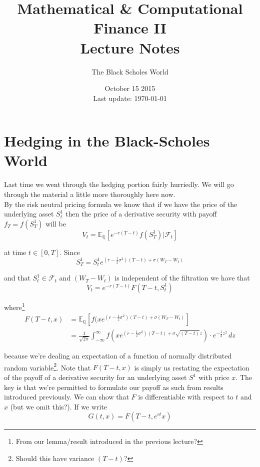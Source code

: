 \documentclass[12pt]{article}
\newlength\tindent
\renewcommand{\indent}{\hspace*{\tindent}}
\begin{document}
 
 
\title{Mathematical \& Computational Finance II\\Lecture Notes}
\author{The Black Scholes World}
\date{October 15 2015 \\ Last update: \today{}}
\maketitle

\section{Hedging in the Black-Scholes World}

\indent Last time we went through the hedging portion fairly hurriedly. We will go through the material a little more thoroughly here now. \\

\indent By the risk neutral pricing formula we know that if we have the price of the underlying asset $S^1_t$ then the price of a derivative security with payoff $f_T = f(S^1_T)$ will be
\begin{equation*}
	V_t = \mathbb E_{\mathbb Q}[e^{-r(T - t)}f(S^1_T) | \mathcal F_t]
\end{equation*}

at time $t \in [0, T]$. Since
\begin{equation*}
	S^1_T = S^1_te^{(r - \frac{1}{2}\sigma^2)(T - t) + \sigma(W_T - W_t)}
\end{equation*}

and that $S^1_t \in \mathcal F_t$ and $(W_T - W_t)$ is independent of the filtration we have that
\begin{equation*}
	V_t = e^{-r(T - t)}F(T - t, S^1_t)
\end{equation*}

where\footnote{From our lemma/result introduced in the previous lecture?} 
\begin{align*}
	F(T - t,x) &= \mathbb E_{\mathbb Q}[f(xe^{(r - \frac{1}{2}\sigma^2)(T - t) + \sigma(W_T - W_t)}] \\
	&= \frac{1}{\sqrt{2\pi}} \int^\infty_{-\infty} f(xe^{(r - \frac{1}{2}\sigma^2)(T - t) + \sigma\sqrt{(T - t)}z}) \cdot e^{-\frac{1}{2}z^2}\,dz
\end{align*}

because we're dealing an expectation of a function of normally distributed random variable\footnote{Should this have variance $(T - t)$?}. Note that $F(T - t,x)$ is simply us restating the expectation of the payoff of a derivative security for an underlying asset $S^1$ with price $x$. The key is that we're permitted to formulate our payoff as such from results introduced previously. We can show that $F$ is differentiable with respect to $t$ and $x$ (but we omit this?). If we write
\begin{equation*}
	G(t,x) = F(T - t, e^{rt}x)
\end{equation*}
\end{document}
